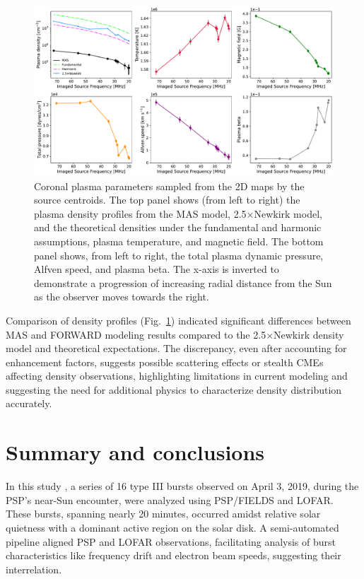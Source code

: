 \begin{figure}[!htp]
	\centering
	\includegraphics[width=\textwidth]{chapter3/figs/scatterplots_FORWARD_plasma_diagnostics_2019-04-01_4R.pdf}
	\caption{Coronal plasma parameters sampled from the 2D maps by the source centroids. The top panel shows (from left to right) the plasma density profiles from the MAS model, 2.5×Newkirk model, and the theoretical densities under the fundamental and harmonic assumptions, plasma temperature, and magnetic field. The bottom panel shows, from left to right, the total plasma dynamic pressure, Alfven speed, and plasma beta. The x-axis is inverted to demonstrate a progression of increasing radial distance from the Sun as the observer moves towards the right.}
	\label{scatterplot}
\end{figure}

Comparison of density profiles (Fig.~\ref{scatterplot}) indicated significant differences between MAS and FORWARD modeling results compared to the 2.5$\times$Newkirk density model and theoretical expectations. The discrepancy, even after accounting for enhancement factors, suggests possible scattering effects or stealth CMEs affecting density observations, highlighting limitations in current modeling and suggesting the need for additional physics to characterize density distribution accurately.

\section{Summary and conclusions}
\label{sec_ch3_conclusions}
In this study \citep{mnedal_2023b}, a series of 16 type III bursts observed on April 3, 2019, during the PSP's near-Sun encounter, were analyzed using PSP/FIELDS and LOFAR. These bursts, spanning nearly 20 minutes, occurred amidst relative solar quietness with a dominant active region on the solar disk. A semi-automated pipeline aligned PSP and LOFAR observations, facilitating analysis of burst characteristics like frequency drift and electron beam speeds, suggesting their interrelation.

